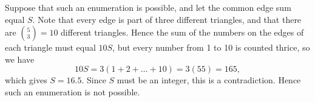 Suppose that such an enumeration is possible, and let the common edge sum equal $S$. Note that every edge is part of three different triangles, and that there are ${5 \choose 3} = 10$ different triangles. Hence the sum of the numbers on the edges of each triangle must equal $10S$, but every number from 1 to 10 is counted thrice, so we have 
$$10S = 3(1+2+\dots+10) = 3(55) = 165,$$
which gives $S = 16.5$. Since $S$ must be an integer, this is a contradiction. Hence such an enumeration is not possible. 